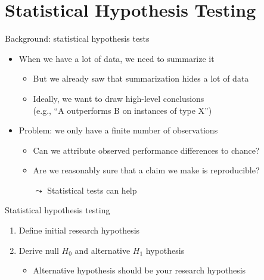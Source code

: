 \section{Statistical Hypothesis Testing}
\begin{frame}[c]{Background: statistical hypothesis tests}

\begin{itemize}
	\item When we have a lot of data, we need to summarize it
	\begin{itemize}
		\item But we already saw that summarization hides a lot of data
		\item Ideally, we want to draw high-level conclusions\\
		(e.g., ``A outperforms B on instances of type X'')
	\end{itemize}
	
	\pause
	\bigskip
	
	\item Problem: we only have a finite number of observations
	\begin{itemize}
		\item Can we attribute observed performance differences to chance?
		\item Are we reasonably sure that a claim we make is reproducible?
		\item[$\leadsto$] Statistical tests can help
	\end{itemize}
	
	
\end{itemize}

\medskip

\end{frame}
\begin{frame}[c]{Statistical hypothesis testing}

\begin{enumerate}
\item Define initial research hypothesis
\pause
\item Derive null $H_0$ and alternative $H_1$ hypothesis
\begin{itemize}
	\item Alternative hypothesis should be your research hypothesis
\end{itemize}
\end{enumerate}	

\end{frame}
